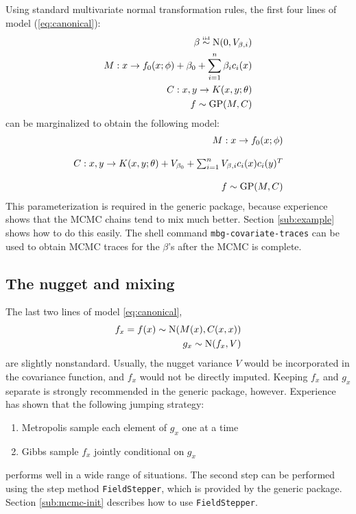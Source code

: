 Using standard multivariate normal transformation rules, the first four lines of model (\ref{eq:canonical}):
\begin{eqnarray*}
    \beta \stackrel{\textup{\tiny iid}}{\sim} \textup{N}(0,V_{\beta,i}) \\
    M:x\rightarrow f_0(x;\phi)+\beta_0 + \sum_{i=1}^n \beta_i c_i(x)\\
    C:x,y\rightarrow K(x,y;\theta)\\
    f \sim \textup{GP}(M,C)
\end{eqnarray*}
can be marginalized to obtain the following model:
\begin{equation}
    \label{eq:int-covariates} 
    \begin{array}{r}
    M:x\rightarrow f_0(x;\phi)\\\\
    C:x,y\rightarrow K(x,y;\theta) + V_{\beta_0} + \sum_{i=1}^n V_{\beta,i}c_i(x)c_i(y)^T\\\\
    f\sim\textup{GP}(M,C)
    \end{array}
\end{equation}
This parameterization is required in the generic package, because experience shows that the MCMC chains tend to mix much better. Section \ref{sub:example} shows how to do this easily. The shell command \texttt{mbg-covariate-traces} can be used to obtain MCMC traces for the $\beta$'s after the MCMC is complete.

\subsection{The nugget and mixing}

The last two lines of model \ref{eq:canonical},
\begin{eqnarray*}
    f_x = f(x) \sim \textup{N}(M(x), C(x,x))\\
    g_x \sim \textup{N}(f_x, V)
\end{eqnarray*}
are slightly nonstandard. Usually, the nugget variance $V$ would be incorporated in the covariance function, and $f_x$ would not be directly imputed. Keeping $f_x$ and $g_x$ separate is strongly recommended in the generic package, however. Experience has shown that the following jumping strategy:
\begin{enumerate}
    \item Metropolis sample each element of $g_x$ one at a time
    \item Gibbs sample $f_x$ jointly conditional on $g_x$
\end{enumerate}
performs well in a wide range of situations. The second step can be performed using the step method \texttt{FieldStepper}, which is provided by the generic package. Section \ref{sub:mcmc-init} describes how to use \texttt{FieldStepper}. 


